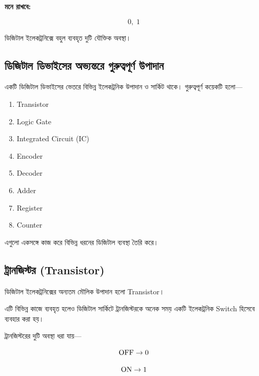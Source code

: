 \textbf{মনে রাখবে:}

\[
\boxed{0,\;1}
\]

ডিজিটাল ইলেকট্রনিক্সে বহুল ব্যবহৃত দুটি যৌক্তিক অবস্থা।
\par\endgroup



\subsection{ডিজিটাল ডিভাইসের অভ্যন্তরে গুরুত্বপূর্ণ উপাদান}

একটি ডিজিটাল ডিভাইসের ভেতরে বিভিন্ন ইলেকট্রনিক উপাদান
ও সার্কিট থাকে। গুরুত্বপূর্ণ কয়েকটি হলো—

\begin{enumerate}
    \item \textenglish{Transistor}
    \item \textenglish{Logic Gate}
    \item \textenglish{Integrated Circuit (IC)}
    \item \textenglish{Encoder}
    \item \textenglish{Decoder}
    \item \textenglish{Adder}
    \item \textenglish{Register}
    \item \textenglish{Counter}
\end{enumerate}

এগুলো একসঙ্গে কাজ করে বিভিন্ন ধরনের ডিজিটাল ব্যবস্থা তৈরি করে।


\subsection{ট্রানজিস্টর
(\textenglish{Transistor})}

ডিজিটাল ইলেকট্রনিক্সের অন্যতম মৌলিক উপাদান হলো
\textenglish{Transistor}।

এটি বিভিন্ন কাজে ব্যবহৃত হলেও ডিজিটাল সার্কিটে
ট্রানজিস্টরকে অনেক সময় একটি ইলেকট্রনিক
\textenglish{Switch} হিসেবে ব্যবহার করা হয়।

ট্রানজিস্টরের দুটি অবস্থা ধরা যায়—

\[
\text{\textenglish{OFF}}\rightarrow0
\]

\[
\text{\textenglish{ON}}\rightarrow1
\]

